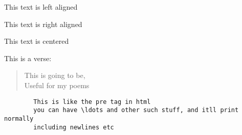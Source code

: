 \documentclass[a4paper,12pt,titlepage]{article} %
\begin{document}
	\begin{flushleft}
		This text is left aligned
	\end{flushleft}

	\begin{flushright}
		This text is right aligned
	\end{flushright}		
	
	\begin{center}
		This text is centered
	\end{center}		
	
	This is a verse:
	\begin{verse}
		This is going to be,\\
		Useful for my poems
	\end{verse}
	

	\begin{verbatim}
		This is like the pre tag in html
		you can have \ldots and other such stuff, and itll print normally
		including newlines etc
	\end{verbatim}
		
\end{document}
